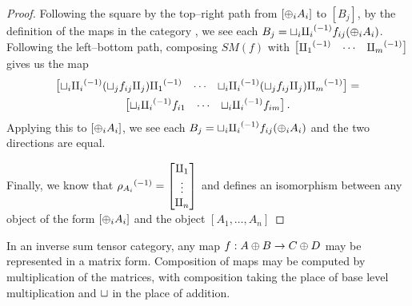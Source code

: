 \begin{proof}
  Following the square by the top--right path from $[\oplus_i A_i]$ to $[B_j]$, by the definition of
  the maps in the category \imatx, we see each $B_j = \sqcup_i{\amalg_{i}}^{(-1)} f_{ij}(\oplus_i A_i)$.
  Following the left--bottom path, composing $SM(f)$ with $\begin{bmatrix}{\amalg_{1}}^{(-1)}& \cdots
  &{\amalg_{m}}^{(-1)}\end{bmatrix}$ gives us the map
  \begin{multline*}
    \begin{bmatrix}\sqcup_i {\amalg_{i}}^{(-1)} (\sqcup_j f_{ij}\amalg_{j}){\amalg_{1}}^{(-1)}& \cdots
      &\sqcup_i {\amalg_{i}}^{(-1)} (\sqcup_j f_{ij}\amalg_{j}){\amalg_{m}}^{(-1)}\end{bmatrix} = \\
      \begin{bmatrix}\sqcup_i {\amalg_{i}}^{(-1)}  f_{i 1}& \cdots &\sqcup_i {\amalg_{i}}^{(-1)} f_{i m}\end{bmatrix}.
  \end{multline*}
  Applying this to $[\oplus_i A_i]$, we see each $B_j = \sqcup_i{\amalg_{i}}^{(-1)} f_{ij}(\oplus_i A_i)$ and the
  two directions are equal.

  Finally, we know that ${\rho_{A_i}}^{(-1)} = \begin{bmatrix}\amalg_{1}\\ \vdots \\\amalg_{n}\end{bmatrix}$
  and defines an isomorphism between any object of the form $[\oplus_i A_i]$ and the
  object $[A_1,\ldots,A_n]$
\end{proof}
\begin{lemma}\label{lem:inverse_sum_category_maps_are_matrices}
  In an inverse sum tensor category, any map $f:A\oplus B \to C\oplus D$ may be represented in a matrix form.
  Composition of maps may be computed by multiplication of the matrices, with composition taking
  the place of base level multiplication and $\sqcup$ in the place of addition.
\end{lemma}
